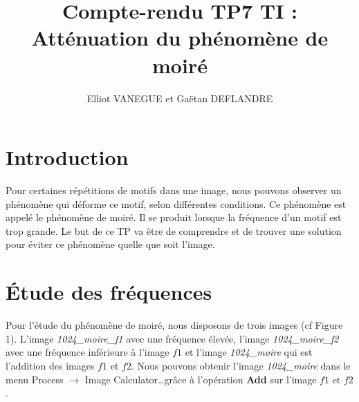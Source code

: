 \documentclass[a4paper,11pt]{article}
\title{Compte-rendu TP7 TI : Atténuation du phénomène de moiré}
\author{Elliot VANEGUE et Gaëtan DEFLANDRE}
\begin{document}


  \maketitle
  
  \mbox{}
  \newpage
  \clearpage
  
  \section*{Introduction}
  Pour certaines répétitions de motifs dans une image, nous pouvons observer un phénomène qui déforme ce motif, selon différentes conditions. 
  Ce phénomène est appelé le phénomène de moiré. Il se produit lorsque la fréquence d’un motif est trop grande. Le but de ce TP va être de 
  comprendre et de trouver une solution pour éviter ce phénomène quelle que soit l’image.\\
 
  \section{Étude des fréquences}
  Pour l’étude du phénomène de moiré, nous disposons de trois images (cf Figure 1). L’image \textit{1024\_moire\_f1} avec une fréquence élevée, 
  l’image \textit{1024\_moire\_f2} avec une fréquence inférieure à l’image $f1$ et l’image \textit{1024\_moire} qui est l’addition des images 
  $f1$ et $f2$. Nous pouvons obtenir l’image \textit{1024\_moire} dans le menu Process $\rightarrow$ Image Calculator\ldots grâce à l’opération 
  \textbf{Add} sur l’image $f1$ et $f2$.\\
\end{document}
